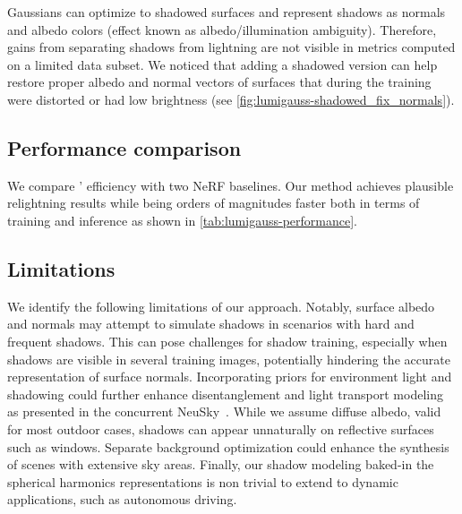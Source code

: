     Gaussians can optimize to shadowed surfaces and represent shadows as
    normals and albedo colors (effect known as albedo/illumination ambiguity).
    Therefore, gains from separating shadows from lightning are not visible in
    metrics computed on a limited data subset.
    We noticed that adding a shadowed version can help restore proper albedo
    and normal vectors of surfaces that during the training were distorted or
    had low brightness (see \cref{fig:lumigauss-shadowed_fix_normals}).

  \subsection{Performance comparison}
    We compare \lumigauss' efficiency with two NeRF baselines.
    Our method achieves plausible relightning results while being orders of
    magnitudes faster both in terms of training and inference as shown in
    \cref{tab:lumigauss-performance}.
  \subsection{Limitations}
    We identify the following limitations of our approach.
    Notably, surface albedo and normals may attempt to simulate shadows in
    scenarios with hard and frequent shadows.
    This can pose challenges for shadow training, especially when shadows are
    visible in several training images, potentially hindering the accurate
    representation of surface normals.
    Incorporating priors for environment light and shadowing could further
    enhance disentanglement and light transport modeling as presented in the
    concurrent NeuSky~\cite{gardner2023neusky}.
    While we assume diffuse albedo, valid for most outdoor cases, shadows can
    appear unnaturally on reflective surfaces such as windows.
    Separate background optimization could enhance the synthesis of scenes
    with extensive sky areas.
    Finally, our shadow modeling baked-in the spherical harmonics
    representations is non trivial to extend to dynamic applications, such as
    autonomous driving.
